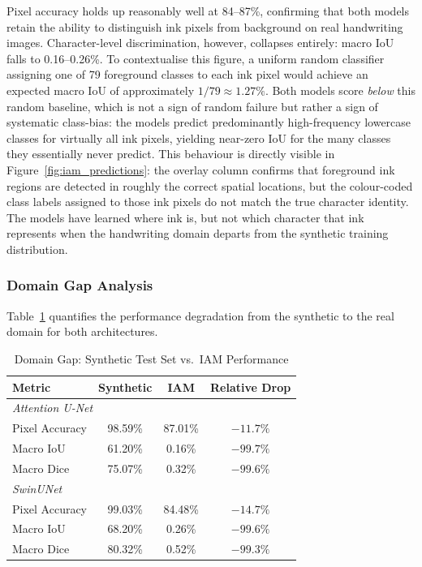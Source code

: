 \documentclass[a4paper,11pt]{article}
\begin{document}
Pixel accuracy holds up reasonably well at 84--87\%, confirming that both models retain
the ability to distinguish ink pixels from background on real handwriting images.
Character-level discrimination, however, collapses entirely: macro IoU falls to
0.16--0.26\%. To contextualise this figure, a uniform random classifier assigning one of
79 foreground classes to each ink pixel would achieve an expected macro IoU of
approximately $1/79 \approx 1.27\%$. Both models score \emph{below} this random baseline,
which is not a sign of random failure but rather a sign of systematic class-bias: the
models predict predominantly high-frequency lowercase classes for virtually all ink pixels,
yielding near-zero IoU for the many classes they essentially never predict. This behaviour
is directly visible in Figure~\ref{fig:iam_predictions}: the overlay column confirms that
foreground ink regions are detected in roughly the correct spatial locations, but the
colour-coded class labels assigned to those ink pixels do not match the true character
identity. The models have learned where ink is, but not which character that ink
represents when the handwriting domain departs from the synthetic training distribution.

\subsubsection{Domain Gap Analysis}

Table~\ref{tab:domain_gap} quantifies the performance degradation from the synthetic to
the real domain for both architectures.

\begin{table}[H]
\centering
\caption{Domain Gap: Synthetic Test Set vs.\ IAM Performance}
\label{tab:domain_gap}
\begin{tabular}{lccc}
\toprule
\textbf{Metric} & \textbf{Synthetic} & \textbf{IAM} & \textbf{Relative Drop} \\
\midrule
\multicolumn{4}{l}{\textit{Attention U-Net}} \\
\addlinespace[2pt]
Pixel Accuracy & 98.59\% & 87.01\% & $-11.7\%$ \\
Macro IoU      & 61.20\% & 0.16\%  & $-99.7\%$ \\
Macro Dice     & 75.07\% & 0.32\%  & $-99.6\%$ \\
\midrule
\multicolumn{4}{l}{\textit{SwinUNet}} \\
\addlinespace[2pt]
Pixel Accuracy & 99.03\% & 84.48\% & $-14.7\%$ \\
Macro IoU      & 68.20\% & 0.26\%  & $-99.6\%$ \\
Macro Dice     & 80.32\% & 0.52\%  & $-99.3\%$ \\
\bottomrule
\end{tabular}
\end{table}
\end{document}
